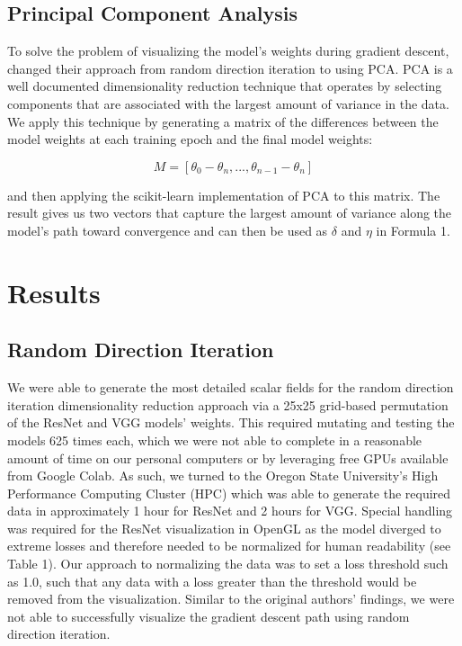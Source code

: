\documentclass{acmsiggraph}
\begin{document}
\subsection{Principal Component Analysis}

To solve the problem of visualizing the model's weights during gradient descent, \cite{NEURIPS2018_a41b3bb3} changed their approach from random direction iteration to using PCA. PCA is a well documented dimensionality reduction technique that operates by selecting components that are associated with the largest amount of variance in the data. We apply this technique by generating a matrix of the differences between the model weights at each training epoch and the final model weights:

\begin{equation} \label{eq1}
M = [\theta_0 - \theta_n, . . ., \theta_{n-1} - \theta_n]
\end{equation}

and then applying the scikit-learn implementation of PCA to this matrix. The result gives us two vectors that capture the largest amount of variance along the model's path toward convergence and can then be used as $\delta$ and $\eta$ in Formula 1.

\section{Results}
\label{sec:intro}

\subsection{Random Direction Iteration}
We were able to generate the most detailed scalar fields for the random direction iteration dimensionality reduction approach via a 25x25 grid-based permutation of the ResNet and VGG models' weights. This required mutating and testing the models 625 times each, which we were not able to complete in a reasonable amount of time on our personal computers or by leveraging free GPUs available from Google Colab. As such, we turned to the Oregon State University's High Performance Computing Cluster (HPC) which was able to generate the required data in approximately 1 hour for ResNet and 2 hours for VGG. Special handling was required for the ResNet visualization in OpenGL as the model diverged to extreme losses and therefore needed to be normalized for human readability (see Table 1). Our approach to normalizing the data was to set a loss threshold such as 1.0, such that any data with a loss greater than the threshold would be removed from the visualization. Similar to the original authors' findings, we were not able to successfully visualize the gradient descent path using random direction iteration.
\end{document}

